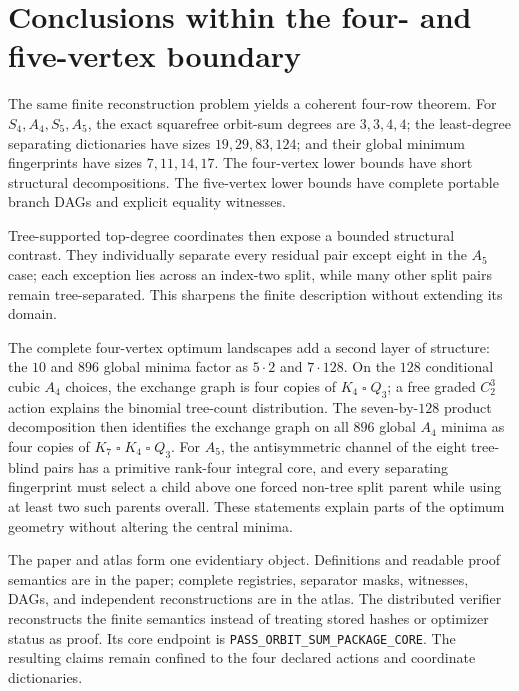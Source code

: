 \section{Conclusions within the four- and five-vertex boundary}
\label{sec:conclusion}

The same finite reconstruction problem yields a coherent four-row theorem.
For $S_4,A_4,S_5,A_5$, the exact squarefree orbit-sum degrees are
$3,3,4,4$; the least-degree separating dictionaries have sizes $19,29,83,124$; and
their global minimum fingerprints have sizes $7,11,14,17$.  The four-vertex
lower bounds have short structural decompositions.  The five-vertex lower
bounds have complete portable branch DAGs and explicit equality witnesses.

Tree-supported top-degree coordinates then expose a bounded structural
contrast.  They individually separate every residual pair except eight in
the $A_5$ case; each exception lies across an index-two split, while many other
split pairs remain tree-separated.  This sharpens the finite description
without extending its domain.

The complete four-vertex optimum landscapes add a second layer of structure:
the $10$ and $896$ global minima factor as $5\cdot2$ and $7\cdot128$.
On the $128$ conditional cubic $A_4$ choices, the exchange graph is four
copies of $K_4\mathbin{\square}Q_3$; a free graded $C_2^3$ action explains the
binomial tree-count distribution.  The seven-by-$128$ product decomposition
then identifies the exchange graph on all $896$ global $A_4$ minima as four
copies of $K_7\mathbin{\square}K_4\mathbin{\square}Q_3$.  For $A_5$, the
antisymmetric channel of the eight tree-blind pairs has a primitive rank-four
integral core, and every separating fingerprint must select a child above one
forced non-tree split parent while using at least two such parents overall.
These statements explain parts of the optimum geometry without altering the
central minima.

The paper and atlas form one evidentiary object.  Definitions and readable
proof semantics are in the paper; complete registries, separator masks,
witnesses, DAGs, and independent reconstructions are in the atlas.  The
distributed verifier reconstructs the finite semantics instead of treating
stored hashes or optimizer status as proof.  Its core endpoint is
\texttt{PASS\_ORBIT\_SUM\_PACKAGE\_CORE}.  The resulting claims remain
confined to the four declared actions and coordinate dictionaries.
